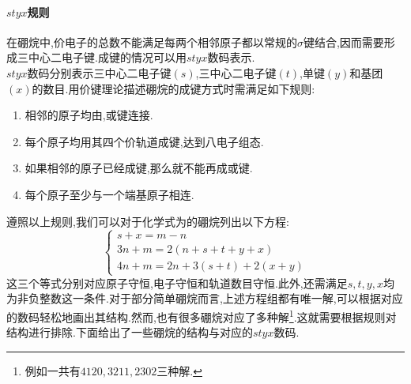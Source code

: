 \documentclass{ctexart}
\begin{document}
\paragraph{$styx$规则}
在硼烷中,价电子的总数不能满足每两个相邻原子都以常规的$\sigma$键结合,因而需要形成三中心二电子键.成键的情况可以用$styx$数码表示.\\
\indent $styx$数码分别表示三中心二电子键$(s)$,三中心二电子键$(t)$,单键$(y)$和基团$(x)$的数目.用价键理论描述硼烷的成键方式时需满足如下规则:
\begin{enumerate}[label=\tbf{\arabic*.},topsep=0pt,parsep=0pt,itemsep=0pt,partopsep=0pt]
    \item 相邻的原子均由,或键连接.
    \item 每个原子均用其四个价轨道成键,达到八电子组态.
    \item 如果相邻的原子已经成键,那么就不能再成或键.
    \item 每个原子至少与一个端基原子相连.
\end{enumerate}
遵照以上规则,我们可以对于化学式为的硼烷列出以下方程:
\[\left\{\begin{array}{l}
    s+x=m-n\\
    3n+m=2(n+s+t+y+x)\\
    4n+m=2n+3(s+t)+2(x+y)
\end{array}\right.\]
这三个等式分别对应原子守恒,电子守恒和轨道数目守恒.此外,还需满足$s,t,y,x$均为非负整数这一条件.对于部分简单硼烷而言,上述方程组都有唯一解,可以根据对应的数码轻松地画出其结构.然而,也有很多硼烷对应了多种解\footnote{例如一共有$4120,3211,2302$三种解.}.这就需要根据规则对结构进行排除.下面给出了一些硼烷的结构与对应的$styx$数码.
\end{document}
